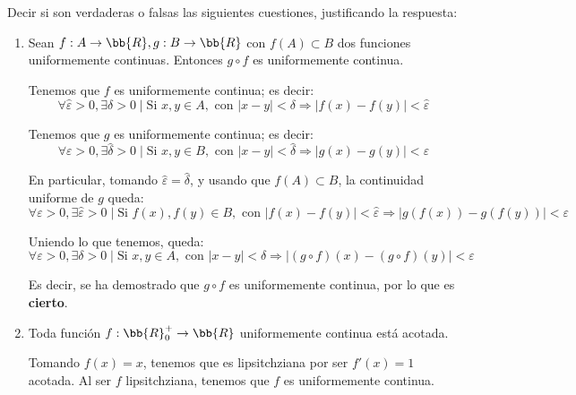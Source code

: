\documentclass[12pt]{article}
\begin{document}
\begin{ejercicio}
    Decir si son verdaderas o falsas las siguientes cuestiones, justificando la respuesta:

    \begin{enumerate}
        \item Sean $f:A\to \bb{R},g:B\to \bb{R}$ con $f(A)\subset B$ dos funciones uniformemente continuas. Entonces $g\circ f$ es uniformemente continua.

        Tenemos que $f$ es uniformemente continua; es decir:
        \begin{equation*}
            \forall \hat{\varepsilon} > 0, \exists \delta>0 \mid \text{Si } x,y\in A, \text{ con } |x-y|<\delta \Longrightarrow |f(x)-f(y)|<\hat{\varepsilon}
        \end{equation*}

        Tenemos que $g$ es uniformemente continua; es decir:
        \begin{equation*}
            \forall {\varepsilon} > 0, \exists \hat{\delta}>0 \mid \text{Si } x,y\in B, \text{ con } |x-y|<\hat{\delta} \Longrightarrow |g(x)-g(y)|<{\varepsilon}
        \end{equation*}

        En particular, tomando $\hat{\varepsilon} = \hat{\delta}$, y usando que $f(A)\subset B$, la continuidad uniforme de $g$ queda:
        \begin{equation*}
            \forall {\varepsilon} > 0, \exists \hat{\varepsilon}>0 \mid \text{Si } f(x),f(y)\in B, \text{ con } |f(x)-f(y)|<\hat{\varepsilon} \Longrightarrow |g(f(x))-g(f(y))|<{\varepsilon}
        \end{equation*}

        Uniendo lo que tenemos, queda:
        \begin{equation*}
            \forall \varepsilon>0, \exists \delta>0\mid  \text{Si } x,y\in A, \text{ con } |x-y|<\delta \Longrightarrow |(g\circ f)(x)-(g\circ f)(y)|<{\varepsilon}
        \end{equation*}

        Es decir, se ha demostrado que $g\circ f$ es uniformemente continua, por lo que es \textbf{cierto}.

        \item Toda función $f:\bb{R}^+_0\to \bb{R}$ uniformemente continua está acotada.

        Tomando $f(x)=x$, tenemos que es lipsitchziana por ser $f'(x)=1$ acotada. Al ser $f$ lipsitchziana, tenemos que $f$ es uniformemente continua.


\end{enumerate}
\end{ejercicio}
\end{document}
